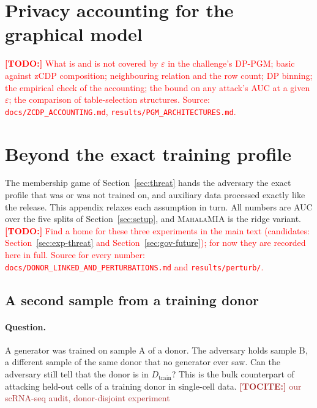 \documentclass[webpdf,contemporary,large]{oup-authoring-template}
\newif\ifdraft \drafttrue
\newcommand{\annot}[3]{\ifdraft\textcolor{#1}{\textbf{[#2:]} #3}\fi}
\newcommand{\todo}[1]{\annot{red}{TODO}{#1}}
\newcommand{\tocite}[1]{\annot{Brown}{TOCITE}{#1}}
\newcommand{\Dtrain}{D_{\mathrm{train}}}
\newcommand{\mahala}{\textsc{MahalaMIA}}
\begin{document}
\begin{appendices}
\section{Privacy accounting for the graphical model}
\label{app:accounting}
\todo{What is and is not covered by $\varepsilon$ in the challenge's DP-PGM; basic against zCDP composition; neighbouring relation and the row count; DP binning; the empirical check of the accounting; the bound on any attack's AUC at a given $\varepsilon$; the comparison of table-selection structures. Source: \texttt{docs/ZCDP\_ACCOUNTING.md}, \texttt{results/PGM\_ARCHITECTURES.md}.}

\section{Beyond the exact training profile}
\label{app:beyond}

The membership game of Section~\ref{sec:threat} hands the adversary the exact profile that was or was not trained on, and auxiliary data processed exactly like the release. This appendix relaxes each assumption in turn. All numbers are AUC over the five splits of Section~\ref{sec:setup}, and \mahala{} is the ridge variant.
\todo{Find a home for these three experiments in the main text (candidates: Section~\ref{sec:exp-threat} and Section~\ref{sec:gov-future}); for now they are recorded here in full. Source for every number: \texttt{docs/DONOR\_LINKED\_AND\_PERTURBATIONS.md} and \texttt{results/perturb/}.}

\subsection{A second sample from a training donor}
\label{app:donor}

\paragraph{Question.}
A generator was trained on sample A of a donor. The adversary holds sample B, a different sample of the same donor that no generator ever saw. Can the adversary still tell that the donor is in $\Dtrain$? This is the bulk counterpart of attacking held-out cells of a training donor in single-cell data. \tocite{our scRNA-seq audit, donor-disjoint experiment}


\end{appendices}
\end{document}
